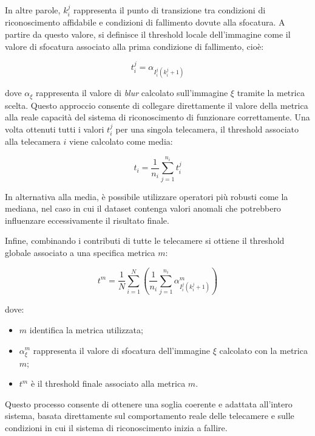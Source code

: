 \documentclass[
    target=bach,
    aauheader=,
    style=
]{thud}
\begin{document}
In altre parole, $k_i^j$ rappresenta il punto di transizione tra condizioni di riconoscimento affidabile e condizioni di fallimento dovute alla sfocatura. A partire da questo valore, si definisce il threshold locale dell'immagine come il valore di sfocatura associato alla prima condizione di fallimento, cioè:

\begin{equation}
t_i^j = \alpha_{I_i^j(k_i^j + 1)}
\end{equation}

dove $\alpha_{\xi}$ rappresenta il valore di \textit{blur} calcolato sull'immagine $\xi$ tramite la metrica scelta. Questo approccio consente di collegare direttamente il valore della metrica alla reale capacità del sistema di riconoscimento di funzionare correttamente. Una volta ottenuti tutti i valori $t_i^j$ per una singola telecamera, il threshold associato alla telecamera $i$ viene calcolato come media:

\begin{equation}
t_i = \frac{1}{n_i} \sum_{j=1}^{n_i} t_i^j
\end{equation}

In alternativa alla media, è possibile utilizzare operatori più robusti come la mediana, nel caso in cui il dataset contenga valori anomali che potrebbero influenzare eccessivamente il risultato finale.

Infine, combinando i contributi di tutte le telecamere si ottiene il threshold globale associato a una specifica metrica $m$:

\begin{equation}
  t^m = \frac{1}{N} \sum_{i=1}^{N} \left ( \frac{1}{n_i} \sum_{j=1}^{n_i} \alpha_{I_i^j (k_i^j+1)}^m \right )
\end{equation}

dove:
\begin{itemize}
    \item $m$ identifica la metrica utilizzata;
    \item $\alpha_{\xi}^m$ rappresenta il valore di sfocatura dell'immagine $\xi$ calcolato con la metrica $m$;
    \item $t^m$ è il threshold finale associato alla metrica $m$.
\end{itemize}

Questo processo consente di ottenere una soglia coerente e adattata all'intero sistema, basata direttamente sul comportamento reale delle telecamere e sulle condizioni in cui il sistema di riconoscimento inizia a fallire.
\end{document}
